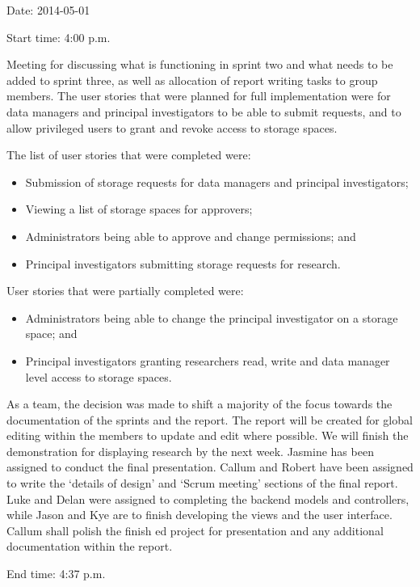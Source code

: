 \documentclass[a4paper,titlepage,12pt]{article}
\begin{document}
Date: 2014-05-01

Start time: 4:00 p.m.

Meeting for discussing what is functioning in sprint two and what needs to be
added to sprint three, as well as allocation of report writing tasks to group
members. The user stories that were planned for full implementation were for
data managers and principal investigators to be able to submit requests, and to
allow privileged users to grant and revoke access to storage spaces.

The list of user stories that were completed were:

\begin{itemize}
	\item Submission of storage requests for data managers and principal
	      investigators;
	\item Viewing a list of storage spaces for approvers;
	\item Administrators being able to approve and change permissions; and
	\item Principal investigators submitting storage requests for research.
\end{itemize}

User stories that were partially completed were:

\begin{itemize}
	\item Administrators being able to change the principal investigator on
	      a storage space; and
	\item Principal investigators granting researchers read, write and data
	      manager level access to storage spaces.
\end{itemize}

As a team, the decision was made to shift a majority of the focus towards the
documentation of the sprints and the report. The report will be created for
global editing within the members to update and edit where possible. We will
finish the demonstration for displaying research by the next week. Jasmine
has been assigned to conduct the final presentation. Callum and Robert have
been assigned to write the `details of design' and `Scrum meeting' sections of
the final report. Luke and Delan were assigned to completing the backend models
and controllers, while Jason and Kye are to finish developing the views and the
user interface. Callum shall polish the finish ed project for presentation and
any additional documentation within the report.

End time: 4:37 p.m.
\end{document}
